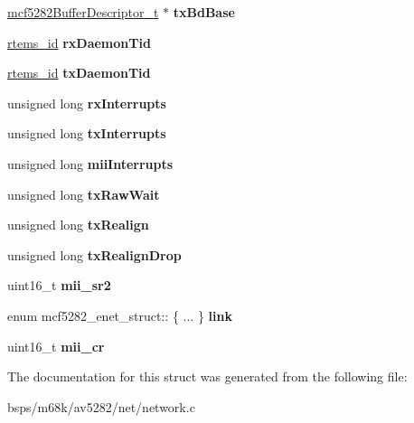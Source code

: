 \begin{DoxyCompactItemize}
\item 
\mbox{\label{structmcf5282__enet__struct_a3ee08bdb205bb90565183e8ff41f9003}} 
\mbox{\hyperlink{structmcf5282BufferDescriptor__}{mcf5282\+Buffer\+Descriptor\+\_\+t}} $\ast$ {\bfseries tx\+Bd\+Base}
\item 
\mbox{\label{structmcf5282__enet__struct_a504d17b4422a0c545b1823ca9bfff450}} 
\mbox{\hyperlink{group__ClassicTasks_gab20892b814dced7dd4e5b9bf42becd57}{rtems\+\_\+id}} {\bfseries rx\+Daemon\+Tid}
\item 
\mbox{\label{structmcf5282__enet__struct_ad31505691aaf09613aa052bd5f1f4eae}} 
\mbox{\hyperlink{group__ClassicTasks_gab20892b814dced7dd4e5b9bf42becd57}{rtems\+\_\+id}} {\bfseries tx\+Daemon\+Tid}
\item 
\mbox{\label{structmcf5282__enet__struct_a7f11b349f36467a3a9294c77bd03c128}} 
unsigned long {\bfseries rx\+Interrupts}
\item 
\mbox{\label{structmcf5282__enet__struct_a584addf108086c284a6da4fa1c58fd76}} 
unsigned long {\bfseries tx\+Interrupts}
\item 
\mbox{\label{structmcf5282__enet__struct_a650dd85b152c83856fd81329203e4ec6}} 
unsigned long {\bfseries mii\+Interrupts}
\item 
\mbox{\label{structmcf5282__enet__struct_a639a9a2957873e541b06f798cdf98dcb}} 
unsigned long {\bfseries tx\+Raw\+Wait}
\item 
\mbox{\label{structmcf5282__enet__struct_a69bc74035c37263d3c3b8657d10e25b5}} 
unsigned long {\bfseries tx\+Realign}
\item 
\mbox{\label{structmcf5282__enet__struct_a8b3013ba4d51666931437c56c50af2aa}} 
unsigned long {\bfseries tx\+Realign\+Drop}
\item 
\mbox{\label{structmcf5282__enet__struct_a5238dd1293eda06feafe83bc9b5b6d00}} 
uint16\+\_\+t {\bfseries mii\+\_\+sr2}
\item 
\mbox{\label{structmcf5282__enet__struct_a948c6236b02e4460a1c9ab4df06e7287}} 
enum mcf5282\+\_\+enet\+\_\+struct\+:: \{ ... \}  {\bfseries link}
\item 
\mbox{\label{structmcf5282__enet__struct_af1b8c48a686147bf00f1a0578d8e57d4}} 
uint16\+\_\+t {\bfseries mii\+\_\+cr}
\end{DoxyCompactItemize}


The documentation for this struct was generated from the following file\+:\begin{DoxyCompactItemize}
\item 
bsps/m68k/av5282/net/network.\+c\end{DoxyCompactItemize}
